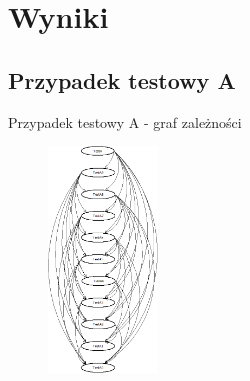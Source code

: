 \documentclass{beamer}
\begin{document}
\section{Wyniki}

\subsection*{Przypadek testowy A}

\begin{frame}{Przypadek testowy A - graf zależności}
\begin{figure}[H]
	\begin{center}
  		\includegraphics[height=6cm]{TestA.png}
	\end{center}
\end{figure}
\end{frame}
\end{document}
